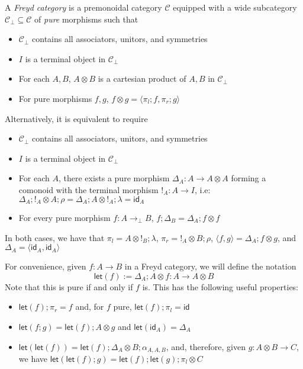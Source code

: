 \documentclass[acmsmall,screen,review]{acmart}
\newcommand{\mc}[1]{\ensuremath{\mathcal{#1}}}
\newcommand{\ms}[1]{\ensuremath{\mathsf{#1}}}
\newcommand{\tmor}[1]{{!}_{#1}}
\newcommand{\dmor}[1]{{\Delta}_{#1}}
\newcommand{\lmor}[1]{\ms{let}(#1)}
\begin{document}
\begin{definition}
  A \emph{Freyd category} is a premonoidal category $\mc{C}$ equipped with a wide subcategory
  $\mc{C}_\bot \subseteq \mc{C}$ of \emph{pure} morphisms such that
  \begin{itemize}
    \item $\mc{C}_\bot$ contains all associators, unitors, and symmetries
    \item $I$ is a terminal object in $\mc{C}_\bot$
    \item For each $A, B$, $A \otimes B$ is a cartesian product of $A, B$ in $\mc{C}_\bot$
    \item For pure morphisms $f, g$, $f \otimes g = \langle \pi_l; f, \pi_r ; g  \rangle$
  \end{itemize}
  Alternatively, it is equivalent to require
  \begin{itemize}
    \item $\mc{C}_\bot$ contains all associators, unitors, and symmetries
    \item $I$ is a terminal object in $\mc{C}_\bot$
    \item For each $A$, there exists a pure morphism $\dmor{A} : A \to A \otimes A$ forming a
          comonoid with the terminal morphism $\tmor{A} : A \to I$, i.e: $\dmor{A} ; \tmor{A}
          \otimes A ; \rho = \dmor{A} ; A \otimes \tmor {A} ; \lambda = \ms{id}_A$
    \item For every pure morphism $f : A \to_\bot B$, $f ; \dmor{B} = \dmor{A} ; f \otimes f$
  \end{itemize}
  In both cases, we have that $\pi_l = A \otimes \tmor{B} ; \lambda$, $\pi_r = \tmor{A}
  \otimes B ; \rho$, $\langle f, g \rangle = \dmor{A} ; f \otimes g$, and $\dmor{A} = \langle
  \ms{id}_A, \ms{id}_A \rangle$
\end{definition}
For convenience, given $f : A \to B$ in a Freyd category, we will define the notation
\begin{equation}
  \lmor{f} := \dmor{A} ; A \otimes f : A \to A \otimes B
\end{equation}
Note that this is pure if and only if $f$ is. This has the following useful properties:
\begin{itemize}
  \item $\lmor{f} ; \pi_r = f$ and, for $f$ pure, $\lmor{f} ; \pi_l = \ms{id}$
  \item $\lmor{f;g} = \lmor{f} ; A \otimes g$ and $\lmor{\ms{id}_A} = \dmor{A}$
  \item $\lmor{\lmor{f}} = \lmor{f} ; \dmor{A} \otimes B ; \alpha_{A, A, B}$, and, therefore, given
  $g: A \otimes B \to C$, we have $\lmor{\lmor{f};g} = \lmor{f} ; \lmor{g} ; \pi_l \otimes C$
\end{itemize}
\end{document}
